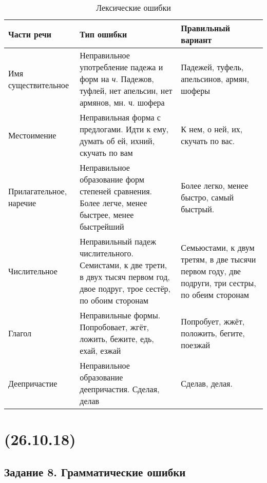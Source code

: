 \documentclass{article}
\begin{document}
\begin{longtable}[c]{|p{3cm}|p{4cm}|p{4cm}|}
  \caption{Лексические ошибки}\\
  \hline
  \textbf{Части речи} & \textbf{Тип ошибки} & \textbf{Правильный вариант}\\
  \hline
  Имя существительное & Неправильное употребление падежа и форм на \textit{ч}. Падежов, туфлей, нет апельсин,
  нет армянов, мн. ч. шофера & Падежей, туфель, апельсинов, армян, шоферы\\
  \hline
  Местоимение & Неправильная форма с предлогами. Идти к ему, думать об ей, ихний, скучать по вам & К нем, о ней, их,
  скучать по вас.\\
  \hline
  Прилагательное, наречие & Неправильное образование форм степеней сравнения. Более легче, менее быстрее, менее
  быстрейший & Более легко, менее быстро, самый быстрый.\\
  \hline
  Числительное & Неправильный падеж числительного. Семистами, к две трети, в двух тысяч первом год, двое подруг,
  трое сестёр, по обоим сторонам & Семьюстами, к двум третям, в две тысячи первом году, две подруги, три сестры,
  по обеим сторонам\\
  \hline
  Глагол & Неправильные формы. Попробовает, жгёт, ложить, бежите, едь, ехай, езжай & Попробует, жжёт, положить, бегите,
  поезжай\\
  \hline
  Деепричастие & Неправильное образование деепричастия. Сделая, делав & Сделав, делая.\\
  \hline
\end{longtable}

\newpage
\noindent\makebox[\linewidth]{\rule{\paperwidth}{0.4pt}}
\section{(26.10.18)}
\noindent\makebox[\linewidth]{\rule{\paperwidth}{0.4pt}}

\subsection{Задание 8. Грамматические ошибки}
\end{document}
